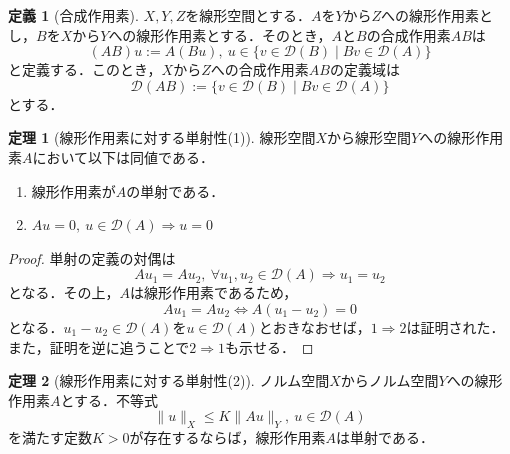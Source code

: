 \documentclass[11pt,a4paper,titlepage]{jsreport}
\theoremstyle{definition}
\newtheorem{dfn}{定義}
\newtheorem{thm}{定理}
\begin{document}
\begin{dfn}[合成作用素]
  \label{dfn:合成作用素}
  $X,Y,Z$を線形空間とする．$A$を$Y$から$Z$への線形作用素とし，$B$を$X$から$Y$への線形作用素とする．そのとき，$A$と$B$の合成作用素$AB$は
  \begin{equation*}
    (AB)u:=A(Bu),\ u\in\{v\in\mathcal{D}(B)\mid Bv\in\mathcal{D}(A)\}
  \end{equation*}
  と定義する．このとき，$X$から$Z$への合成作用素$AB$の定義域は
  \begin{equation*}
    \mathcal{D}(AB):=\{v\in\mathcal{D}(B)\mid Bv\in\mathcal{D}(A)\}
  \end{equation*}
  とする．
\end{dfn}

\begin{thm}[線形作用素に対する単射性(1)]
  \label{thm:線形作用素に対する単射性(1)}
  線形空間$X$から線形空間$Y$への線形作用素$A$において以下は同値である．
  \begin{enumerate}
    \item 線形作用素が$A$の単射である．
    \item $Au=0,\ u\in\mathcal{D}(A)\Rightarrow u=0$
  \end{enumerate}
\end{thm}

\begin{proof}
  単射の定義の対偶は
  \begin{equation*}
    Au_1 = Au_2,\ \forall u_1,u_2\in\mathcal{D}(A)\Rightarrow u_1=u_2
  \end{equation*}
  となる．その上，$A$は線形作用素であるため，
  \begin{equation*}
    Au_1=Au_2\Leftrightarrow A(u_1-u_2)=0
  \end{equation*}
  となる．$u_1-u_2\in\mathcal{D}(A)$を$u\in\mathcal{D}(A)$とおきなおせば，$1\Rightarrow2$は証明された．また，証明を逆に追うことで$2\Rightarrow1$も示せる．
\end{proof}

\begin{thm}[線形作用素に対する単射性(2)]
  ノルム空間$X$からノルム空間$Y$への線形作用素$A$とする．不等式
  \begin{equation*}
    \|u\|_X \leq K\|Au\|_Y,\ u\in\mathcal{D}(A)
  \end{equation*}
  を満たす定数$K>0$が存在するならば，線形作用素$A$は単射である．
\end{thm}
\end{document}
